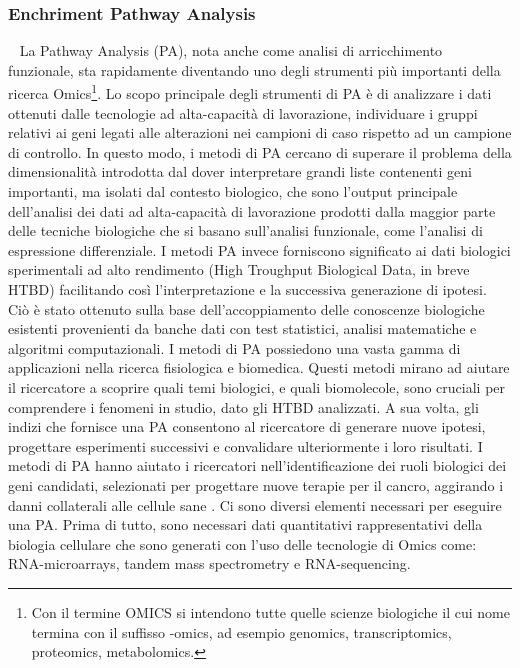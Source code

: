 \subsubsection{Enchriment Pathway Analysis}~\newline
La Pathway Analysis (PA), nota anche come analisi di arricchimento funzionale, sta rapidamente diventando uno degli
strumenti più importanti della ricerca Omics\footnote{Con il termine OMICS si intendono tutte quelle scienze biologiche
il cui nome termina con il suffisso -omics, ad esempio genomics, transcriptomics, proteomics, metabolomics.}. 
Lo scopo principale degli strumenti di PA è di analizzare i dati ottenuti dalle tecnologie ad alta-capacità di
lavorazione, individuare i gruppi relativi ai geni legati alle alterazioni nei campioni di caso rispetto ad un 
campione di controllo. In questo modo, i metodi di PA cercano di superare il problema della dimensionalità 
introdotta dal dover interpretare grandi liste contenenti geni importanti, ma isolati dal contesto biologico, che
sono l'output principale dell'analisi dei dati ad alta-capacità di lavorazione prodotti dalla maggior parte delle
tecniche biologiche che si basano sull'analisi funzionale, come l'analisi di espressione differenziale. 
I metodi PA invece forniscono significato ai dati biologici sperimentali ad alto rendimento (High Troughput Biological
Data, in breve HTBD) facilitando così l'interpretazione e la successiva generazione di ipotesi. 
Ciò è stato ottenuto sulla base dell'accoppiamento delle conoscenze biologiche esistenti provenienti da banche dati 
con test statistici, analisi matematiche e algoritmi computazionali. I metodi di PA possiedono una vasta gamma 
di applicazioni nella ricerca fisiologica e biomedica. Questi metodi mirano ad aiutare il ricercatore a scoprire 
quali temi biologici, e quali biomolecole, sono cruciali per comprendere i fenomeni in studio, dato gli HTBD
analizzati. A sua volta, gli indizi che fornisce una PA consentono al ricercatore di generare nuove ipotesi, progettare
esperimenti successivi e convalidare ulteriormente i loro risultati. I metodi di PA hanno aiutato i ricercatori
nell'identificazione dei ruoli biologici dei geni candidati, selezionati per progettare nuove terapie per il cancro,
aggirando i danni collaterali alle cellule sane \cite{folger2011predicting}.
Ci sono diversi elementi necessari per eseguire una PA. Prima di tutto, sono necessari dati quantitativi rappresentativi
della biologia cellulare che sono generati con l'uso delle tecnologie di Omics come: RNA-microarrays, tandem mass
spectrometry e RNA-sequencing. 
